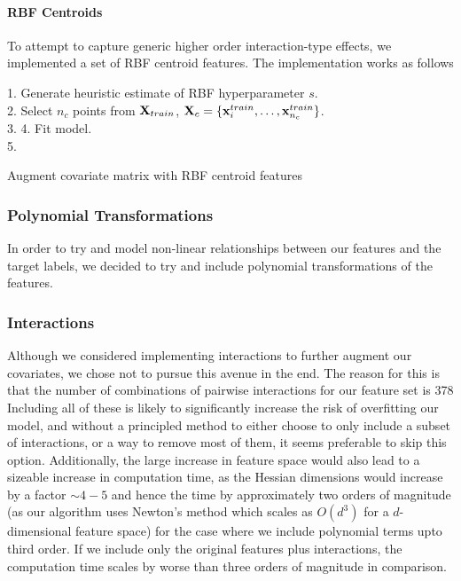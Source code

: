 \paragraph{RBF Centroids}
To attempt to capture generic higher order interaction-type effects, we implemented a set of RBF centroid features. The implementation works as follows \newline
\begin{algorithm}[H]
    1. Generate heuristic estimate of RBF hyperparameter $s$.\\
    2. Select $n_c$ points from $\mathbf{X}_{train}$, $\mathbf{X}_c = \{\mathbf{x}^{train}_i, \dots, \mathbf{x}^{train}_{n_c}\}$.\\
    3.  
    4. Fit model.\\
    5. 
    \caption{Augment covariate matrix with RBF centroid features}
\end{algorithm}

\subsubsection{Polynomial Transformations}
In order to try and model non-linear relationships between our features and the target labels, we decided to try and include polynomial transformations of the features. 

\subsubsection{Interactions}
Although we considered implementing interactions to further augment our covariates, we chose not to pursue this avenue in the end. The reason for this is that the number of combinations of pairwise interactions for our feature set is 378 Including all of these is likely to significantly increase the risk of overfitting our model, and without a principled method to either choose to only include a subset of interactions, or a way to remove most of them, it seems preferable to skip this option. Additionally, the large increase in feature space would also lead to a sizeable increase in computation time, as the Hessian dimensions would increase by a factor $\sim 4-5$ and hence the time by approximately two orders of magnitude (as our algorithm uses Newton's method which scales as $O(d^3)$ for a $d$-dimensional feature space) for the case where we include polynomial terms upto third order. If we include only the original features plus interactions, the computation time scales by worse than three orders of magnitude in comparison.


